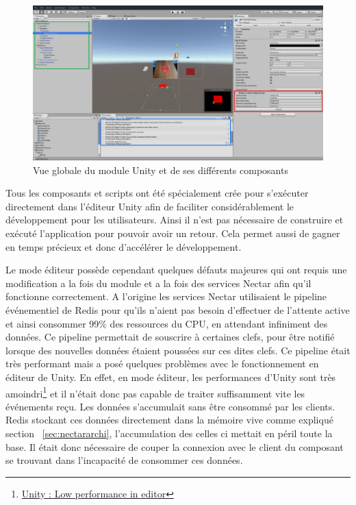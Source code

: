 \begin{figure}[H]
\centering
\includegraphics[width=\linewidth]{images/unity-plugin}
\caption{Vue globale du module Unity et de ses différents composants}
\label{fig:unity:plugin}
\end{figure}

Tous les composants et scripts ont été spécialement crée pour s'exécuter directement dans l'éditeur Unity afin de faciliter considérablement le développement pour les utilisateurs. Ainsi il n'est pas nécessaire de construire et exécuté l'application pour pouvoir avoir un retour. Cela permet aussi de gagner en temps précieux et donc d'accélérer le développement.

Le mode éditeur possède cependant quelques défauts majeures qui ont requis une modification a la fois du module et a la fois des services Nectar afin qu'il fonctionne correctement. 
A l'origine les services Nectar utilisaient le pipeline événementiel de Redis pour qu'ils n'aient pas besoin d'effectuer de l'attente active et ainsi consommer 99\% des ressources du CPU, en attendant infiniment des données. Ce pipeline permettait de souscrire à certaines clefs, pour être notifié lorsque des nouvelles données étaient poussées sur ces dites clefs. Ce pipeline était très performant mais a posé quelques problèmes avec le fonctionnement en éditeur de Unity. En effet, en mode éditeur, les performances d'Unity sont très amoindri\footnote{\href{https://forum.unity.com/threads/low-performance-in-editor-but-working-fine-in-build.489030/}{Unity : Low performance in editor}} et il n'était donc pas capable de traiter suffisamment vite les événements reçu. Les données s'accumulait sans être consommé par les clients. Redis stockant ces données directement dans la mémoire vive comme expliqué section ~\ref{sec:nectararchi}, l'accumulation des celles ci mettait en péril toute la base. Il était donc nécessaire de couper la connexion avec le client du composant se trouvant dans l'incapacité de consommer ces données.

